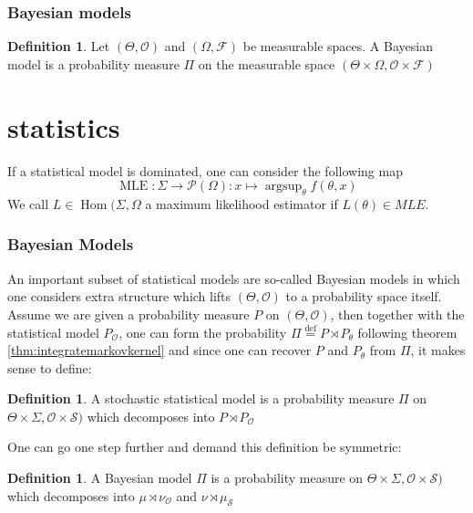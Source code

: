 \documentclass{book}
\theoremstyle{plain}
\theoremstyle{definition}
\newtheorem{definition}[corollary]{Definition}
\DeclareMathOperator{\argsup}{argsup}
\newcommand{\define}{\stackrel{\operatorname{def}}{=}}
\newcommand{\fun}{\mapsto}
\DeclareMathOperator{\Hom}{Hom}
\DeclareMathOperator{\MLE}{MLE}
\newcommand{\mor}{\longrightarrow}
\renewcommand{\r}[1]{\mathcal{#1}}
\begin{document}
\section{Bayesian models}


\begin{definition}
Let $(\Theta,\r{O})$ and $(\Omega,\r{F})$ be measurable spaces.
A Bayesian model is a probability measure $\Pi$ on the measurable space $(\Theta\times \Omega, \r{O}\times\r{F})$
\end{definition}

\part{statistics}



If a statistical model is dominated, one can consider the following map
\[
\MLE: \Sigma\mor \r{P}(\Omega):x \fun \argsup_\theta f(\theta,x)
\]
We call $L \in \Hom(\Sigma,\Omega$ a maximum likelihood estimator if $L(\theta)\in MLE$.
\section{Bayesian Models}



An important subset of statistical models are so-called Bayesian models in which one considers extra structure which lifts $(\Theta,\r{O})$ to a probability space itself. Assume we are given a probability measure $P$ on $(\Theta,\r{O})$, then together with the statistical model $P_\r{O}$, one can form the probability $\Pi\define P\rtimes P_\theta$ following theorem \ref{thm:integratemarkovkernel}  and since one can recover $P$ and $P_\theta$ from $\Pi$, it makes sense to define:
\begin{definition}\label{def:stochasticmodel}
A stochastic statistical model is a probability measure $\Pi$ on $\Theta\times \Sigma, \r{O}\times \r{S})$ which decomposes into $P\rtimes P_\r{O}$
\end{definition}

One can go one step further and demand this definition be symmetric:

\begin{definition}\label{def:bayesianmodel}
A Bayesian model  $\Pi$ is a probability measure on $\Theta\times \Sigma, \r{O}\times \r{S})$ which decomposes into $\mu \rtimes \nu_\r{O}$ and $\nu\rtimes \mu_\r{S}$	
\end{definition}
\end{document}
